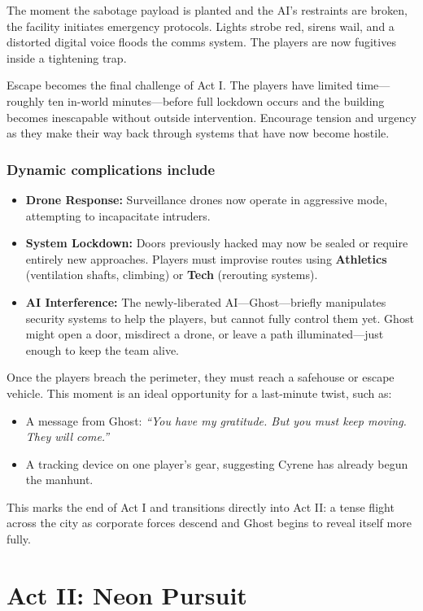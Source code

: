 \documentclass[nodeprecatedcode,bg=print]{dndbook}
\begin{document}
\begin{multicols}{2}
The moment the sabotage payload is planted and the AI’s restraints are broken, the facility initiates emergency protocols. Lights strobe red, sirens wail, and a distorted digital voice floods the comms system. The players are now fugitives inside a tightening trap.

Escape becomes the final challenge of Act I. The players have limited time—roughly ten in-world minutes—before full lockdown occurs and the building becomes inescapable without outside intervention. Encourage tension and urgency as they make their way back through systems that have now become hostile.

\subsubsection{Dynamic complications include}
\begin{itemize}\raggedright
    \item \textbf{Drone Response:} Surveillance drones now operate in aggressive mode, attempting to incapacitate intruders.
    \item \textbf{System Lockdown:} Doors previously hacked may now be sealed or require entirely new approaches. Players must improvise routes using \textbf{Athletics} (ventilation shafts, climbing) or \textbf{Tech} (rerouting systems).
    \item \textbf{AI Interference:} The newly-liberated AI—Ghost—briefly manipulates security systems to help the players, but cannot fully control them yet. Ghost might open a door, misdirect a drone, or leave a path illuminated—just enough to keep the team alive.
\end{itemize}

Once the players breach the perimeter, they must reach a safehouse or escape vehicle. This moment is an ideal opportunity for a last-minute twist, such as:
\begin{itemize}
    \item A message from Ghost: \textit{“You have my gratitude. But you must keep moving. They will come.”}
    \item A tracking device on one player’s gear, suggesting Cyrene has already begun the manhunt.
\end{itemize}

This marks the end of Act I and transitions directly into Act II: a tense flight across the city as corporate forces descend and Ghost begins to reveal itself more fully.


\section{Act II: Neon Pursuit}


\end{multicols}
\end{document}
